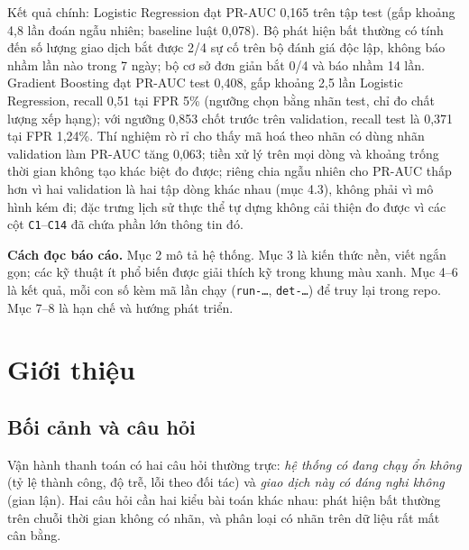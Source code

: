 \documentclass[11pt,a4paper]{article}
\newcommand{\code}[1]{\texttt{\small #1}}
\begin{document}
Kết quả chính: Logistic Regression đạt PR-AUC 0,165 trên tập test (gấp khoảng 4,8 lần đoán ngẫu nhiên; baseline luật 0,078). Bộ phát hiện bất thường có tính đến số lượng giao dịch bắt được 2/4 sự cố trên bộ đánh giá độc lập, không báo nhầm lần nào trong 7 ngày; bộ cơ sở đơn giản bắt 0/4 và báo nhầm 14 lần. Gradient Boosting đạt PR-AUC test 0,408, gấp khoảng 2,5 lần Logistic Regression, recall 0,51 tại FPR 5\% (ngưỡng chọn bằng nhãn test, chỉ đo chất lượng xếp hạng); với ngưỡng 0,853 chốt trước trên validation, recall test là 0,371 tại FPR 1,24\%. Thí nghiệm rò rỉ cho thấy mã hoá theo nhãn có dùng nhãn validation làm PR-AUC tăng 0,063; tiền xử lý trên mọi dòng và khoảng trống thời gian không tạo khác biệt đo được; riêng chia ngẫu nhiên cho PR-AUC thấp hơn vì hai validation là hai tập dòng khác nhau (mục 4.3), không phải vì mô hình kém đi; đặc trưng lịch sử thực thể tự dựng không cải thiện đo được vì các cột \code{C1}--\code{C14} đã chứa phần lớn thông tin đó.

\vspace{0.5em}
\begin{keypoint}
\textbf{Cách đọc báo cáo.} Mục 2 mô tả hệ thống. Mục 3 là kiến thức nền, viết ngắn gọn; các kỹ thuật ít phổ biến được giải thích kỹ trong khung màu xanh. Mục 4--6 là kết quả, mỗi con số kèm mã lần chạy (\code{run-…}, \code{det-…}) để truy lại trong repo. Mục 7--8 là hạn chế và hướng phát triển.
\end{keypoint}

\tableofcontents
\newpage

\section{Giới thiệu}

\subsection{Bối cảnh và câu hỏi}
Vận hành thanh toán có hai câu hỏi thường trực: \emph{hệ thống có đang chạy ổn không} (tỷ lệ thành công, độ trễ, lỗi theo đối tác) và \emph{giao dịch này có đáng nghi không} (gian lận). Hai câu hỏi cần hai kiểu bài toán khác nhau: phát hiện bất thường trên chuỗi thời gian không có nhãn, và phân loại có nhãn trên dữ liệu rất mất cân bằng.
\end{document}

